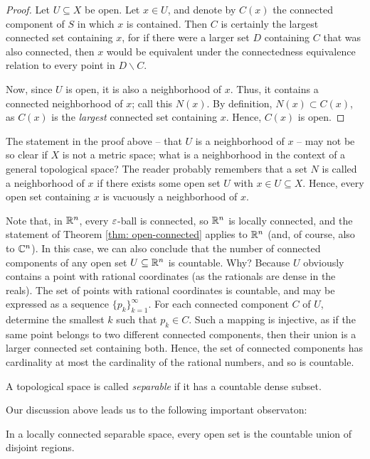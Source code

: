 \begin{proof}
	Let $U \subseteq X$ be open. Let $x \in U$, and denote by $C(x)$ the connected component of $S$ in which $x$ is contained. Then $C$ is certainly the largest connected set containing $x$, for if there were a larger set $D$ containing $C$ that was also connected, then $x$ would be equivalent under the connectedness equivalence relation to every point in $D \backslash C$.
	
	Now, since $U$ is open, it is also a neighborhood of $x$. Thus, it contains a connected neighborhood of $x$; call this $N(x)$. By definition, $N(x) \subset C(x)$, as $C(x)$ is the \textit{largest} connected set containing $x$. Hence, $C(x)$ is open.
\end{proof}

The statement in the proof above -- that $U$ is a neighborhood of $x$ -- may not be so clear if $X$ is not a metric space; what is a neighborhood in the context of a general topological space? The reader probably remembers that a set $N$ is called a neighborhood of $x$ if there exists some open set $U$ with $x \in U \subseteq X$. Hence, every open set containing $x$ is vacuously a neighborhood of $x$.

Note that, in $\mathbb R^n$, every $\varepsilon$-ball is connected, so $\mathbb R^n$ is locally connected, and the statement of Theorem \ref{thm: open-connected} applies to $\mathbb R^n$ (and, of course, also to $\mathbb C^n$). In this case, we can also conclude that the number of connected components of any open set $U \subseteq \mathbb R^n$ is countable. Why? Because $U$ obviously contains a point with rational coordinates (as the rationals are dense in the reals). The set of points with rational coordinates is countable, and may be expressed as a sequence $\{p_k\}_{k=1}^{\infty}$. For each connected component $C$ of $U$, determine the smallest $k$ such that $p_k \in C$. Such a mapping is injective, as if the same point belongs to two different connected components, then their union is a larger connected set containing both. Hence, the set of connected components has cardinality at most the cardinality of the rational numbers, and so is countable.

\begin{definition}
	A topological space is called \emph{separable} if it has a countable dense subset.
\end{definition}

Our discussion above leads us to the following important observaton:
\begin{proposition}
	In a locally connected separable space, every open set is the countable union of disjoint regions.
\end{proposition}

